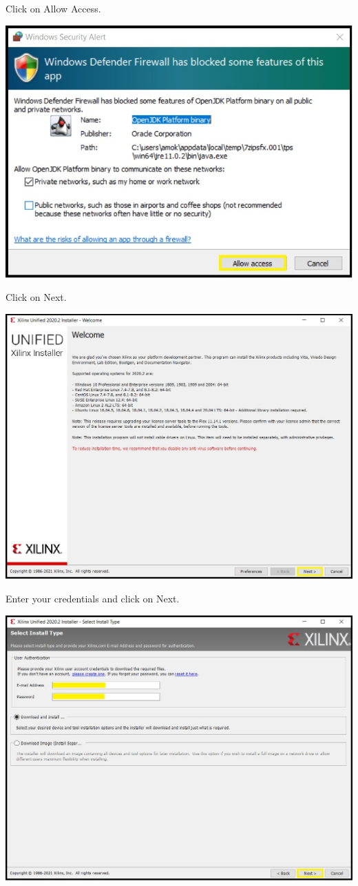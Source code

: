 \begin{minipage}{\linewidth}
  Click on Allow Access.
  \\
  \begin{center}
    \includegraphics[width=0.5\linewidth]{images/VivadoInstimg007.jpg}
  \end{center}
\end{minipage}

\begin{minipage}{\linewidth}
  Click on Next.
  \\
  \begin{center}
    \includegraphics[width=0.7\linewidth]{images/VivadoInstimg008.jpg}
  \end{center}
\end{minipage}

\begin{minipage}{\linewidth}
  Enter your credentials and click on Next.
  \\
  \begin{center}
    \includegraphics[width=0.7\linewidth]{images/VivadoInstimg009.jpg}
  \end{center}
\end{minipage}

